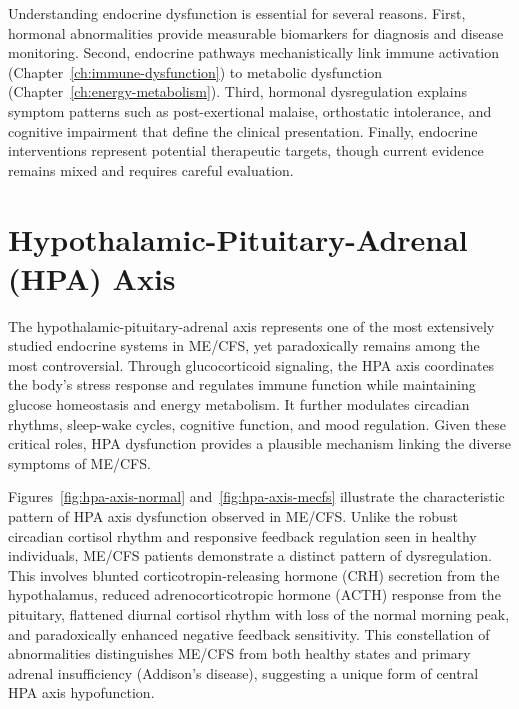 Understanding endocrine dysfunction is essential for several reasons. First, hormonal abnormalities provide measurable biomarkers for diagnosis and disease monitoring. Second, endocrine pathways mechanistically link immune activation (Chapter~\ref{ch:immune-dysfunction}) to metabolic dysfunction (Chapter~\ref{ch:energy-metabolism}). Third, hormonal dysregulation explains symptom patterns such as post-exertional malaise, orthostatic intolerance, and cognitive impairment that define the clinical presentation. Finally, endocrine interventions represent potential therapeutic targets, though current evidence remains mixed and requires careful evaluation.

\section{Hypothalamic-Pituitary-Adrenal (HPA) Axis}
\label{sec:hpa-axis}

The hypothalamic-pituitary-adrenal axis represents one of the most extensively studied endocrine systems in ME/CFS, yet paradoxically remains among the most controversial. Through glucocorticoid signaling, the HPA axis coordinates the body's stress response and regulates immune function while maintaining glucose homeostasis and energy metabolism. It further modulates circadian rhythms, sleep-wake cycles, cognitive function, and mood regulation. Given these critical roles, HPA dysfunction provides a plausible mechanism linking the diverse symptoms of ME/CFS.





Figures~\ref{fig:hpa-axis-normal} and~\ref{fig:hpa-axis-mecfs} illustrate the characteristic pattern of HPA axis dysfunction observed in ME/CFS. Unlike the robust circadian cortisol rhythm and responsive feedback regulation seen in healthy individuals, ME/CFS patients demonstrate a distinct pattern of dysregulation. This involves blunted corticotropin-releasing hormone (CRH) secretion from the hypothalamus, reduced adrenocorticotropic hormone (ACTH) response from the pituitary, flattened diurnal cortisol rhythm with loss of the normal morning peak, and paradoxically enhanced negative feedback sensitivity. This constellation of abnormalities distinguishes ME/CFS from both healthy states and primary adrenal insufficiency (Addison's disease), suggesting a unique form of central HPA axis hypofunction.

